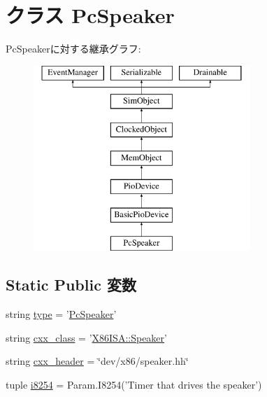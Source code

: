 \hypertarget{classPcSpeaker_1_1PcSpeaker}{
\section{クラス PcSpeaker}
\label{classPcSpeaker_1_1PcSpeaker}
}
PcSpeakerに対する継承グラフ:\begin{figure}[H]
\begin{center}
\leavevmode
\includegraphics[height=7cm]{classPcSpeaker_1_1PcSpeaker}
\end{center}
\end{figure}
\subsection*{Static Public 変数}
\begin{DoxyCompactItemize}
\item 
string \hyperlink{classPcSpeaker_1_1PcSpeaker_acce15679d830831b0bbe8ebc2a60b2ca}{type} = '\hyperlink{classPcSpeaker_1_1PcSpeaker}{PcSpeaker}'
\item 
string \hyperlink{classPcSpeaker_1_1PcSpeaker_a58cd55cd4023648e138237cfc0822ae3}{cxx\_\-class} = '\hyperlink{classX86ISA_1_1Speaker}{X86ISA::Speaker}'
\item 
string \hyperlink{classPcSpeaker_1_1PcSpeaker_a17da7064bc5c518791f0c891eff05fda}{cxx\_\-header} = \char`\"{}dev/x86/speaker.hh\char`\"{}
\item 
tuple \hyperlink{classPcSpeaker_1_1PcSpeaker_ac3df511be44044737575fbb8184ef982}{i8254} = Param.I8254('Timer that drives the speaker')
\end{DoxyCompactItemize}


